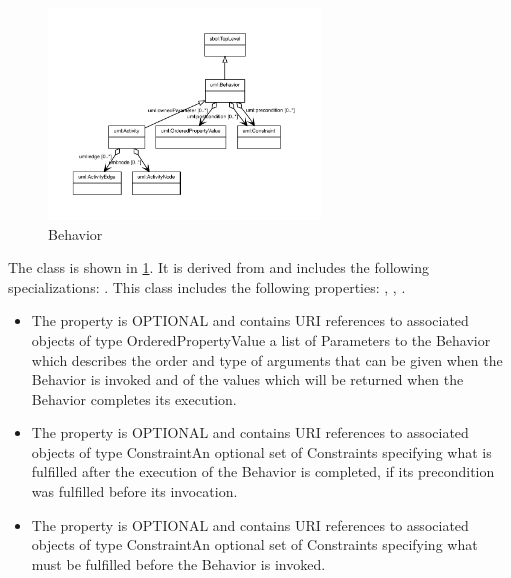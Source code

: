 \begin{figure}[h!]%
\centering%
\includegraphics[width=0.6448936170212766\textwidth]{uml_classes/Behavior_abstraction_hierarchy.pdf}%
\caption{Behavior}%
\label{fig:Behavior}%
\end{figure}

%
The  class is shown in \ref{fig:Behavior}. It is derived from  and includes the following specializations: . %
This class includes the following properties: , , . %
\begin{itemize}%
\item%
The  property is OPTIONAL and contains URI references to associated objects of type OrderedPropertyValue a list of Parameters to the Behavior which describes the order and type of arguments that can be given when the Behavior is invoked and of the values which will be returned when the Behavior completes its execution.%
\item%
The  property is OPTIONAL and contains URI references to associated objects of type ConstraintAn optional set of Constraints specifying what is fulfilled after the execution of the Behavior is completed, if its precondition was fulfilled before its invocation.%
\item%
The  property is OPTIONAL and contains URI references to associated objects of type ConstraintAn optional set of Constraints specifying what must be fulfilled before the Behavior is invoked.%
\end{itemize}%
